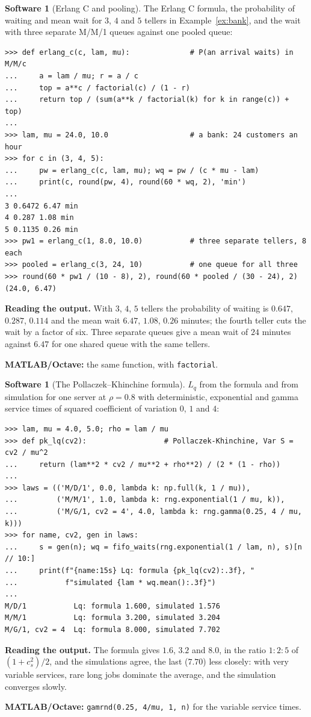 \documentclass[11pt,a4paper]{article}
\numberwithin{equation}{section}
\theoremstyle{definition}
\newtheorem{software}[thm]{Software}
\begin{document}
\begin{software}[Erlang C and pooling]
\label{sw:mmc}
The Erlang C formula, the probability of waiting and mean wait for $3$, $4$ and $5$ tellers in Example~\ref{ex:bank}, and the wait with three separate M/M/1 queues against one pooled queue:
{\small\begin{verbatim}
>>> def erlang_c(c, lam, mu):              # P(an arrival waits) in M/M/c
...     a = lam / mu; r = a / c
...     top = a**c / factorial(c) / (1 - r)
...     return top / (sum(a**k / factorial(k) for k in range(c)) + top)
...
>>> lam, mu = 24.0, 10.0                   # a bank: 24 customers an hour
>>> for c in (3, 4, 5):
...     pw = erlang_c(c, lam, mu); wq = pw / (c * mu - lam)
...     print(c, round(pw, 4), round(60 * wq, 2), 'min')
...
3 0.6472 6.47 min
4 0.287 1.08 min
5 0.1135 0.26 min
>>> pw1 = erlang_c(1, 8.0, 10.0)           # three separate tellers, 8 each
>>> pooled = erlang_c(3, 24, 10)           # one queue for all three
>>> round(60 * pw1 / (10 - 8), 2), round(60 * pooled / (30 - 24), 2)
(24.0, 6.47)
\end{verbatim}}
\textbf{Reading the output.} With $3$, $4$, $5$ tellers the probability of waiting is $0.647$, $0.287$, $0.114$ and the mean wait $6.47$, $1.08$, $0.26$ minutes; the fourth teller cuts the wait by a factor of six. Three separate queues give a mean wait of $24$ minutes against $6.47$ for one shared queue with the same tellers.

\textbf{MATLAB/Octave:} the same function, with \texttt{factorial}.
\end{software}

\begin{software}[The Pollaczek--Khinchine formula]
\label{sw:pk}
$L_q$ from the formula and from simulation for one server at $\rho = 0.8$ with deterministic, exponential and gamma service times of squared coefficient of variation $0$, $1$ and $4$:
{\small\begin{verbatim}
>>> lam, mu = 4.0, 5.0; rho = lam / mu
>>> def pk_lq(cv2):                  # Pollaczek-Khinchine, Var S = cv2 / mu^2
...     return (lam**2 * cv2 / mu**2 + rho**2) / (2 * (1 - rho))
...
>>> laws = (('M/D/1', 0.0, lambda k: np.full(k, 1 / mu)),
...         ('M/M/1', 1.0, lambda k: rng.exponential(1 / mu, k)),
...         ('M/G/1, cv2 = 4', 4.0, lambda k: rng.gamma(0.25, 4 / mu, k)))
>>> for name, cv2, gen in laws:
...     s = gen(n); wq = fifo_waits(rng.exponential(1 / lam, n), s)[n // 10:]
...     print(f"{name:15s} Lq: formula {pk_lq(cv2):.3f}, "
...           f"simulated {lam * wq.mean():.3f}")
...
M/D/1           Lq: formula 1.600, simulated 1.576
M/M/1           Lq: formula 3.200, simulated 3.204
M/G/1, cv2 = 4  Lq: formula 8.000, simulated 7.702
\end{verbatim}}
\textbf{Reading the output.} The formula gives $1.6$, $3.2$ and $8.0$, in the ratio $1 : 2 : 5$ of $(1 + c_s^2)/2$, and the simulations agree, the last ($7.70$) less closely: with very variable services, rare long jobs dominate the average, and the simulation converges slowly.

\textbf{MATLAB/Octave:} \texttt{gamrnd(0.25, 4/mu, 1, n)} for the variable service times.
\end{software}
\end{document}
